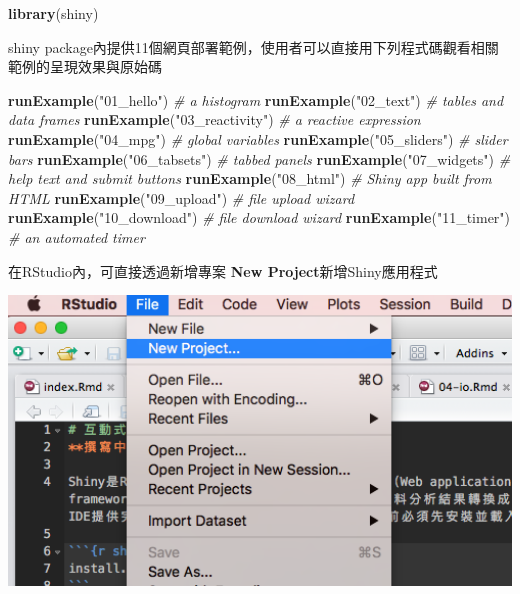 \documentclass[]{book}
\newenvironment{Shaded}{\begin{snugshade}}{\end{snugshade}}
\newcommand{\KeywordTok}[1]{\textcolor[rgb]{0.13,0.29,0.53}{\textbf{{#1}}}}
\newcommand{\StringTok}[1]{\textcolor[rgb]{0.31,0.60,0.02}{{#1}}}
\newcommand{\CommentTok}[1]{\textcolor[rgb]{0.56,0.35,0.01}{\textit{{#1}}}}
\newcommand{\NormalTok}[1]{{#1}}
\theoremstyle{definition}
\theoremstyle{definition}
\theoremstyle{remark}
\begin{document}
\begin{Shaded}
\begin{Highlighting}[]
\KeywordTok{library}\NormalTok{(shiny)}
\end{Highlighting}
\end{Shaded}

shiny
package內提供11個網頁部署範例，使用者可以直接用下列程式碼觀看相關範例的呈現效果與原始碼

\begin{Shaded}
\begin{Highlighting}[]
\KeywordTok{runExample}\NormalTok{(}\StringTok{"01_hello"}\NormalTok{) }\CommentTok{# a histogram}
\KeywordTok{runExample}\NormalTok{(}\StringTok{"02_text"}\NormalTok{) }\CommentTok{# tables and data frames}
\KeywordTok{runExample}\NormalTok{(}\StringTok{"03_reactivity"}\NormalTok{) }\CommentTok{# a reactive expression}
\KeywordTok{runExample}\NormalTok{(}\StringTok{"04_mpg"}\NormalTok{) }\CommentTok{# global variables}
\KeywordTok{runExample}\NormalTok{(}\StringTok{"05_sliders"}\NormalTok{) }\CommentTok{# slider bars}
\KeywordTok{runExample}\NormalTok{(}\StringTok{"06_tabsets"}\NormalTok{) }\CommentTok{# tabbed panels}
\KeywordTok{runExample}\NormalTok{(}\StringTok{"07_widgets"}\NormalTok{) }\CommentTok{# help text and submit buttons}
\KeywordTok{runExample}\NormalTok{(}\StringTok{"08_html"}\NormalTok{) }\CommentTok{# Shiny app built from HTML}
\KeywordTok{runExample}\NormalTok{(}\StringTok{"09_upload"}\NormalTok{) }\CommentTok{# file upload wizard}
\KeywordTok{runExample}\NormalTok{(}\StringTok{"10_download"}\NormalTok{) }\CommentTok{# file download wizard}
\KeywordTok{runExample}\NormalTok{(}\StringTok{"11_timer"}\NormalTok{) }\CommentTok{# an automated timer}
\end{Highlighting}
\end{Shaded}

在RStudio內，可直接透過新增專案 \textbf{New Project}新增Shiny應用程式

\includegraphics[width=6.85in]{figure/shiny1}
\end{document}
